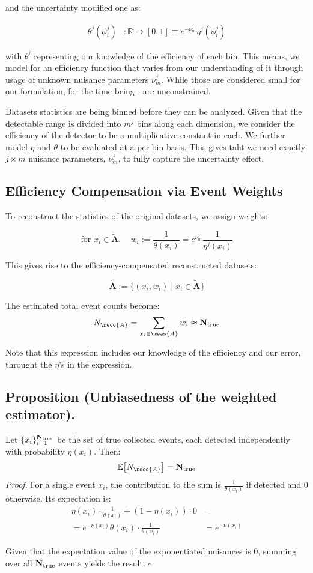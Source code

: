 \documentclass[../../ddppaper3.tex]{subfiles}
\begin{document}
and the uncertainty modified one as:

\begin{align} \label{eq:efficiency_j_explicit_form}
    \theta^j(\phi_i^j) &: \mathbb{R} \to [0,1] \equiv e^{-\nu^j_m}\eta^j(\phi_i^j)
\end{align}

with $\theta^i$ representing our knowledge of the efficiency of each bin. This means, we model for an efficiency function that varies from our understanding of it through usage of unknown nuisance parameters $\nu^j_m$. While those are considered small for our formulation, for the time being - are unconstrained.

Datasets statistics are being binned before they can be analyzed. Given that the detectable range is divided into $m^j$ bins along each dimension, we consider the efficiency of the detector to be a multiplicative constant in each. We further model $\eta$ and $\theta$ to be evaluated at a per-bin basis. This gives taht we need exactly $j \times m$ nuisance parameters, $\nu^j_m$, to fully capture the uncertainty effect.

\subsection{Efficiency Compensation via Event Weights}

To reconstruct the statistics of the original datasets, we assign weights:

\begin{equation}
\label{eq:def_weights}
\text{for } x_i \in \tilde{\mathbf{A}}, \quad w_i := \frac{1}{\theta(x_i)} = e^{\nu^j_m}\frac{1}{\eta^j(x_i)}
\end{equation}

This gives rise to the efficiency-compensated reconstructed datasets:

\[
\dot{\mathbf{A}} := \{ (x_i, w_i) \mid x_i \in \tilde{\mathbf{A}} \}
\]

The estimated total event counts become:
\[
N_\reco{A} = \sum_{x_i \in \meas{A}} w_i \approx \true{N}
\]

Note that this expression includes our knowledge of the efficiency and our error, throught the $\eta$'s in the expression.

\subsection{Proposition (Unbiasedness of the weighted estimator).} \label{prop:unbiasedness_of_weights}
Let \(\{x_i\}_{i=1}^{{{\mathbf{N}}}_{\text{true}}}\) be the set of true collected events, each detected independently with probability \(\eta(x_i)\). Then:
\[
\mathbb{E}\!\left[ N_\reco{A} \right] = \true{N}
\]
\emph{Proof.}
For a single event \(x_i\), the contribution to the sum is \(\frac{1}{\theta(x_i)}\) if detected and \(0\) otherwise. Its expectation is:
\begin{align*}
\eta(x_i) \cdot \frac{1}{\theta(x_i)} + (1-\eta(x_i))\cdot 0 &= \\
= e^{-\nu(x_i)}\theta(x_i) \cdot \frac{1}{\theta(x_i)} &= e^{-\nu(x_i)}
\end{align*}


Given that the expectation value of the exponentiated nuisances is 0, summing over all \({{\mathbf{N}}}_{\text{true}}\) events yields the result. \(\square\)
\end{document}
